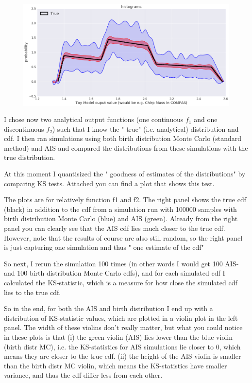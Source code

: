 \documentclass[a4paper,fleqn,usenatbib]{mnras}
\begin{document}
\begin{figure}[h]
	{\includegraphics[width=1\linewidth]{images/snakeplot_pdff1}}
\caption{}\label{fig:ToyModel-snakeplot}
\end{figure}

I chose now two analytical output functions (one continuous $f_1$ and one discontinuous $f_2$) such that I know the " true" (i.e. analytical) distribution and cdf.
I then ran simulations using both birth distribution Monte Carlo (standard method) and AIS and compared the distributions from these simulations with the true distribution.

At this moment I quantisized the " goodness of estimates of the distributions"  by comparing KS tests.
Attached you can find a plot that shows this test.

The plots are for relatively function f1 and f2. The right panel shows the true cdf (black) in addition to the cdf from a simulation run with 100000 samples with birth distribution Monte Carlo (blue) and AIS (green). Already from the right panel you can clearly see that the AIS cdf lies much closer to the true cdf.
However, note that the results of course are also still random, so the right panel is just capturing one simulation and thus " one estimate of the cdf"

So next, I rerun the simulation 100 times (in other words I would get 100 AIS- and 100 birth distribution Monte Carlo cdfs), and for each simulated cdf I calculated the KS-statistic, which is a measure for how close the simulated cdf lies to the true cdf.

So in the end, for both the AIS and birth distribution I end up with a distribution of KS-statistic values, which are plotted in a violin plot in the left panel.
The width of these violins don't really matter, but what you could notice in these plots is that
(i) the green violin (AIS) lies lower than the blue violin (birth distr MC), i.e. the KS-statistics for AIS simulations lie closer to 0, which means they are closer to the true cdf.
(ii) the height of the AIS violin is smaller than the birth distr MC violin, which means the KS-statistics have smaller variance, and thus the cdf differ less from each other.
\end{document}

